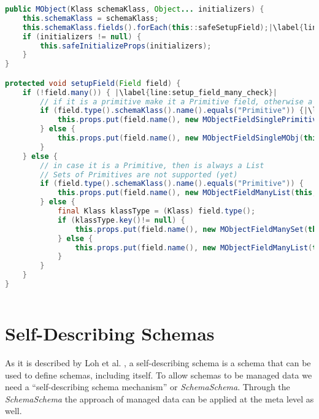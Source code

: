 \begin{sourcecode} [H]
	\begin{lstlisting}[language=Java, escapechar=|]
public MObject(Klass schemaKlass, Object... initializers) {
	this.schemaKlass = schemaKlass;
	this.schemaKlass.fields().forEach(this::safeSetupField);|\label{line:setup_fields}|
	if (initializers != null) {
		this.safeInitializeProps(initializers);
	}
}

protected void setupField(Field field) {
	if (!field.many()) { |\label{line:setup_field_many_check}|
		// if it is a primitive make it a Primitive field, otherwise a reference (managed object)
		if (field.type().schemaKlass().name().equals("Primitive")) {|\label{line:instanceof}|
			this.props.put(field.name(), new MObjectFieldSinglePrimitive(this, field));
		} else {
			this.props.put(field.name(), new MObjectFieldSingleMObj(this, field));
		}
	} else {
		// in case it is a Primitive, then is always a List
		// Sets of Primitives are not supported (yet)
		if (field.type().schemaKlass().name().equals("Primitive")) {
			this.props.put(field.name(), new MObjectFieldManyList(this, field));
		} else {
			final Klass klassType = (Klass) field.type();
			if (klassType.key()!= null) {
				this.props.put(field.name(), new MObjectFieldManySet(this, field));
			} else {
				this.props.put(field.name(), new MObjectFieldManyList(this, field));
			}
		}
	}
}
	\end{lstlisting}
	\caption{MObject: setup fields}
	\label{lst:setup_fields}
\end{sourcecode}

\section{Self-Describing Schemas}\label{Self-Describing Schemas}
As it is described by Loh et al. \cite{loh2012managed}, a self-describing schema is a schema that can be used to define schemas, including itself.
To allow schemas to be managed data we need a ``self-describing schema mechanism'' or \textit{SchemaSchema}.
Through the \textit{SchemaSchema} the approach of managed data can be applied at the meta level as well.


